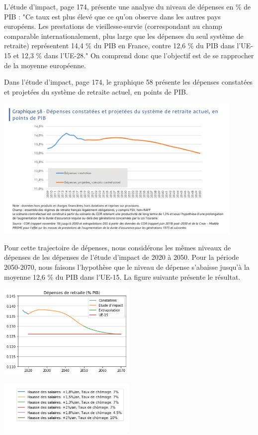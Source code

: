 \documentclass[10pt]{article}
\begin{document}
L'étude d'impact, page 174, présente une analyse du niveau de dépenses 
en \% de PIB : "Ce taux est plus élevé que ce qu’on observe dans 
les autres pays européens. Les prestations de vieillesse-survie 
(correspondant au champ comparable internationalement, plus 
large que les dépenses du seul système de retraite) représentent 
14,4 \% du PIB en France, contre 12,6 \% du PIB dans l’UE-15 et 12,3 \% dans l’UE-28."
On comprend donc que l'objectif est de se rapprocher de la moyenne européenne. 

Dans l'étude d'impact, page 174, le graphique 58 présente les dépenses constatées 
et projetées du système de retraite actuel, en points de PIB.

\begin{center}
\includegraphics[width=0.9\textwidth]{EtudeImpact-depenses-constatees-projetees.png}
\end{center}

Pour cette trajectoire de dépenses, nous considérons les mêmes 
niveaux de dépenses de les dépenses de l'étude d'impact de 2020 à 2050. 
Pour la période 2050-2070, nous faisons l'hypothèse que le niveau 
de dépense s'abaisse jusqu'à la moyenne 12,6 \% du PIB dans l’UE-15. 
La figure suivante présente le résultat. 

\begin{center}
\includegraphics[width=0.5\textwidth]{Simulation-Depenses.png}

\includegraphics[width=0.5\textwidth]{Simulation-legende.png}
\end{center}
\end{document}
